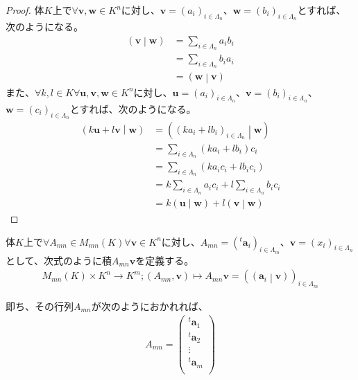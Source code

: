 \documentclass[dvipdfmx]{jsarticle}
\begin{document}
\begin{proof}
体$K$上で$\forall\mathbf{v},\mathbf{w} \in K^{n}$に対し、$\mathbf{v} = \left( a_{i} \right)_{i \in \varLambda_{n}}$、$\mathbf{w} = \left( b_{i} \right)_{i \in \varLambda_{n}}$とすれば、次のようになる。
\begin{align*}
\left( \mathbf{v} \middle| \mathbf{w} \right) &= \sum_{i \in \varLambda_{n}} {a_{i}b_{i}}\\
&= \sum_{i \in \varLambda_{n}} {b_{i}a_{i}}\\
&= \left( \mathbf{w} \middle| \mathbf{v} \right)
\end{align*}
また、$\forall k,l \in K\forall\mathbf{u,v,w} \in K^{n}$に対し、$\mathbf{u} = \left( a_{i} \right)_{i \in \varLambda_{n}}$、$\mathbf{v} = \left( b_{i} \right)_{i \in \varLambda_{n}}$、$\mathbf{w} = \left( c_{i} \right)_{i \in \varLambda_{n}}$とすれば、次のようになる。
\begin{align*}
\left( k\mathbf{u} + l\mathbf{v} \middle| \mathbf{w} \right) &= \left( \left( ka_{i} + lb_{i} \right)_{i \in \varLambda_{n}} \middle| \mathbf{w} \right)\\
&= \sum_{i \in \varLambda_{n}} {\left( ka_{i} + lb_{i} \right)c_{i}}\\
&= \sum_{i \in \varLambda_{n}} \left( ka_{i}c_{i} + lb_{i}c_{i} \right)\\
&= k\sum_{i \in \varLambda_{n}} {a_{i}c_{i}} + l\sum_{i \in \varLambda_{n}} {b_{i}c_{i}}\\
&= k\left( \mathbf{u} \middle| \mathbf{w} \right) + l\left( \mathbf{v} \middle| \mathbf{w} \right)
\end{align*}
\end{proof}
\begin{dfn}
体$K$上で$\forall A_{mn} \in M_{mn}(K)\forall\mathbf{v} \in K^{n}$に対し、$A_{mn} = \left(^{t}\mathbf{a}_{i} \right)_{i \in \varLambda_{m}}$、$\mathbf{v} = \left( x_{i} \right)_{i \in \varLambda_{n}}$として、次式のように積$A_{mn}\mathbf{v}$を定義する。
\begin{align*}
M_{mn}(K) \times K^{n} \rightarrow K^{m};\left( A_{mn},\mathbf{v} \right) \mapsto A_{mn}\mathbf{v} = \left( \left( \mathbf{a}_{i} \middle| \mathbf{v} \right) \right)_{i \in \varLambda_{m}}
\end{align*}
\end{dfn}\par
即ち、その行列$A_{mn}$が次のようにおかれれば、
\begin{align*}
A_{mn} = \begin{pmatrix}
^{t}\mathbf{a}_{1} \\
^{t}\mathbf{a}_{2} \\
 \vdots \\
{^{t}\mathbf{a}}_{m} \\
\end{pmatrix}
\end{align*}
\end{document}
